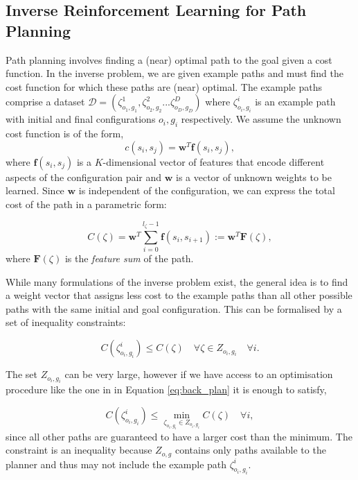 \documentclass{article}  %
\begin{document}
\subsection{Inverse Reinforcement Learning for Path Planning \label{subsec:inverse_problem}}
Path planning involves finding a (near) optimal path to the goal given a cost function. In the inverse problem, we are given example paths and must find the cost function for which these paths are (near) optimal.  The example paths comprise a dataset $\mathcal{D} = (\zeta^1_{o_1,g_1},\zeta^2_{o_2,g_2}...\zeta^D_{o_D,g_D})$ where $\zeta^i_{o_i,g_i}$ is an example path with initial and final configurations $o_i,g_i$ respectively. We assume the unknown cost function is of the form,
\begin{equation}
	c(s_i,s_j) = \mathbf{w}^T \mathbf{f}(s_i,s_j), \label{eq:inner_prod}
\end{equation}
where $\mathbf{f}(s_i,s_j)$ is a $K$-dimensional vector of features that encode different aspects of the configuration pair and $\mathbf{w}$ is a vector of unknown weights to be learned. Since $\mathbf{w}$ is independent of the configuration, we can express the total cost of the path in a parametric form:

\begin{equation}
	C(\zeta) = \mathbf{w}^T\sum_{i=0}^{l_{\zeta}-1} \mathbf{f}(s_i,s_{i+1}) := \mathbf{w}^T \mathbf{F}(\zeta),
\end{equation}
where $\mathbf{F}(\zeta)$ is the \emph{feature sum} of the path.

While many formulations of the inverse problem exist, the general idea is to find a weight vector that assigns less cost to the example paths than all other possible paths with the same initial and goal configuration.  This can be formalised by a set of inequality constraints:

\begin{equation}
	C(\zeta^i_{o_i,g_i}) \leq  C(\zeta) \quad \forall \zeta \in Z_{o_i,g_i}  \quad \forall i. \label{eq:const1}
\end{equation}

The set $Z_{o_i,g_i}$ can be very large, however if we have access to an optimisation procedure like the one in in Equation \eqref{eq:back_plan} it is enough to satisfy, 

\begin{equation}
	C(\zeta^i_{o_i,g_i}) \leq \min_{\zeta_{o_i,g_i} \in Z_{o_i,g_i}} C(\zeta) \quad \forall i, \label{eq:const}
\end{equation}
since all other paths are guaranteed to have a larger cost than the minimum.
The constraint is an inequality because $Z_{o,g}$ contains only paths available to the planner and thus may not include the example path $\zeta^i_{o_i,g_i}$.
\end{document}
